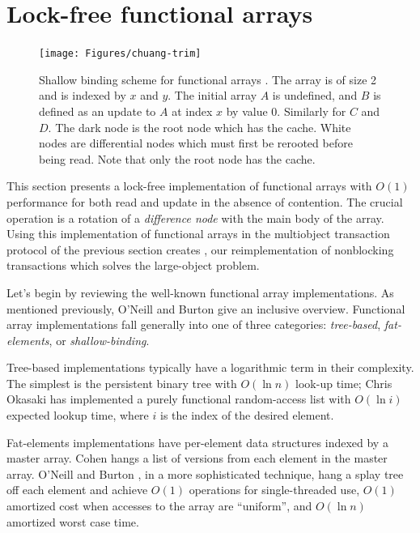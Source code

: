 \section{Lock-free functional arrays}\label{sec:lf-fun-arr}
\begin{figure}[tp]\centering
\texttt{[image: Figures/chuang-trim]}
\caption[Shallow binding scheme for functional arrays.]
  {Shallow binding scheme for functional arrays
  \cite[Figure~1]{Chuang94}.  The array is of size 2 and is indexed by
  $x$ and $y$.  The initial array $A$ is undefined, and $B$ is defined
  as an update to $A$ at index $x$ by value $0$.  Similarly for $C$
  and $D$.  The dark node is the root node which has the cache.  White
  nodes are differential nodes which must first be rerooted before
  being read.  Note that only the root node has the cache.}
\label{fig:chuang}
\end{figure}
This section presents a lock-free implementation of functional
arrays with $O(1)$ performance for both read and update in the absence of contention.
The crucial operation is a rotation of a \emph{difference node} with the
main body of the array. Using this implementation of functional arrays
in the multiobject transaction protocol of the previous section
creates \lapex, our reimplementation of nonblocking transactions which
solves the large-object problem.

Let's begin by reviewing the well-known functional array
implementations.  As mentioned previously,
O'Neill and Burton \cite{ONeillBu97} give an
inclusive overview.  Functional array implementations fall generally
into one of three categories: \emph{tree-based}, \emph{fat-elements},
or \emph{shallow-binding}.

Tree-based implementations typically have a logarithmic term in their
complexity.  The simplest is the persistent binary tree with $O(\ln
n)$ look-up time; Chris Okasaki 
\cite{Okasaki95} has implemented a purely functional random-access list
with $O(\ln i)$ expected lookup time, where $i$ is the index of the
desired element.

Fat-elements implementations have per-element data structures indexed
by a master array. Cohen \cite{Cohen84} hangs a list of
versions from each element in the master array.
O'Neill and Burton \cite{ONeillBu97}, in a more sophisticated
technique, hang a splay tree off each element and achieve $O(1)$
operations for single-threaded use, $O(1)$ amortized cost when
accesses to the array are ``uniform'', and $O(\ln n)$ amortized worst
case time. 

